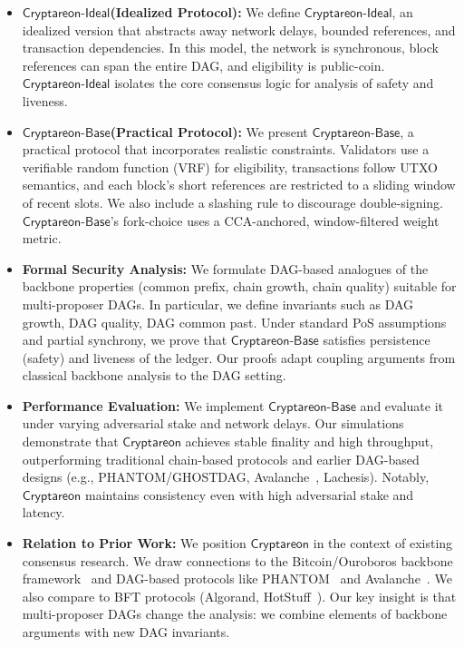 \documentclass[11pt]{article}
\newcommand{\Proj}{\ensuremath{\mathsf{Cryptareon}}\xspace}
\newcommand{\ProjIdeal}{\ensuremath{\mathsf{Cryptareon\text{-}Ideal}}\xspace}
\newcommand{\ProjBase}{\ensuremath{\mathsf{Cryptareon\text{-}Base}}\xspace}
\begin{document}
\begin{itemize}
\item {\bf \ProjIdeal (Idealized Protocol):} We define \ProjIdeal, an idealized version that abstracts away network delays, bounded references, and transaction dependencies. In this model, the network is synchronous, block references can span the entire DAG, and eligibility is public-coin. \ProjIdeal isolates the core consensus logic for analysis of safety and liveness. 
\item {\bf \ProjBase (Practical Protocol):} We present \ProjBase, a practical protocol that incorporates realistic constraints. Validators use a verifiable random function (VRF) for eligibility, transactions follow UTXO semantics, and each block's short references are restricted to a sliding window of recent slots. We also include a slashing rule to discourage double-signing. \ProjBase's fork-choice uses a CCA-anchored, window-filtered weight metric.
\item {\bf Formal Security Analysis:} We formulate DAG-based analogues of the backbone properties (common prefix, chain growth, chain quality) suitable for multi-proposer DAGs. In particular, we define invariants such as DAG growth, DAG quality, DAG common past. %
Under standard PoS assumptions and partial synchrony, we prove that \ProjBase satisfies persistence (safety) and liveness of the ledger. Our proofs adapt coupling arguments from classical backbone analysis to the DAG setting.
\item {\bf Performance Evaluation:} We implement \ProjBase and evaluate it under varying adversarial stake and network delays. Our simulations demonstrate that \Proj achieves stable finality and high throughput, outperforming traditional chain-based protocols and earlier DAG-based designs (e.g., PHANTOM/GHOSTDAG, Avalanche~\cite{SnowFamily}, Lachesis). Notably, \Proj maintains consistency even with high adversarial stake and latency.
\item {\bf Relation to Prior Work:} We position \Proj in the context of existing consensus research. We draw connections to the Bitcoin/Ouroboros backbone framework~\cite{EC:GarKiaLeo15,EC:PasSeeShe17} and DAG-based protocols like PHANTOM~\cite{AFT:SWZ21} and Avalanche~\cite{SnowFamily}. We also compare to BFT protocols (Algorand, HotStuff~\cite{HotStuff}). Our key insight is that multi-proposer DAGs change the analysis: we combine elements of backbone arguments with new DAG invariants. 
\end{itemize}
\end{document}
